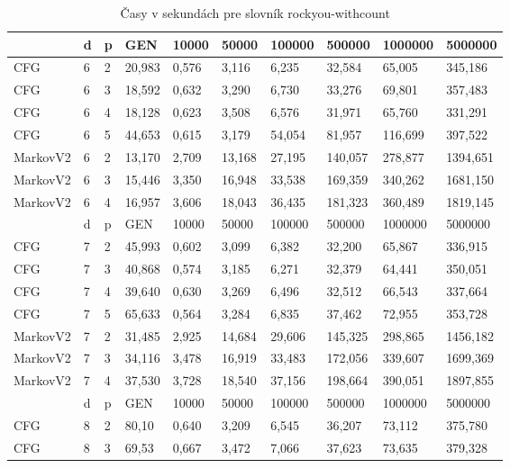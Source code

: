 \begin{table}[]
\centering
\caption{Časy v sekundách pre slovník rockyou-withcount}
\label{tbl:rockyouTime}
\begin{tabular}{lll|lllllll}
       & d & p & GEN     & 10000  & 50000  & 100000 & 500000 & 1000000 & 5000000 \\ \hline
CFG    & 6 & 2 & 20,983   & 0,576  & 3,116  & 6,235  & 32,584 & 65,005  & 345,186 \\
CFG    & 6 & 3 & 18,592    & 0,632  & 3,290  & 6,730  & 33,276 & 69,801  & 357,483 \\
CFG    & 6 & 4 & 18,128   & 0,623  & 3,508   & 6,576   & 31,971 & 65,760  & 331,291 \\
CFG    & 6 & 5 & 44,653 & 0,615 & 3,179 & 54,054 & 81,957 & 116,699 & 397,522 \\
MarkovV2 & 6 & 2 & 13,170     & 2,709  & 13,168  & 27,195  & 140,057 & 278,877  & 1394,651 \\
MarkovV2 & 6 & 3 & 15,446     & 3,350  & 16,948  & 33,538  & 169,359 & 340,262  & 1681,150 \\
MarkovV2 & 6 & 4 & 16,957     & 3,606  & 18,043  & 36,435 & 181,323 & 360,489  & 1819,145 \\ \hline
       & d & p & GEN     & 10000  & 50000  & 100000 & 500000 & 1000000 & 5000000 \\ \hline
CFG    & 7 & 2 & 45,993    & 0,602  & 3,099  & 6,382  & 32,200  & 65,867  & 336,915 \\
CFG    & 7 & 3 & 40,868   & 0,574   & 3,185  & 6,271  & 32,379 & 64,441  & 350,051 \\
CFG    & 7 & 4 & 39,640   & 0,630  & 3,269  & 6,496  & 32,512 & 66,543  & 337,664 \\
CFG    & 7 & 5 & 65,633 & 0,564 & 3,284 & 6,835 & 37,462  & 72,955 & 353,728 \\
MarkovV2 & 7 & 2 & 31,485  & 2,925  & 14,684  & 29,606  & 145,325  & 298,865  & 1456,182 \\
MarkovV2 & 7 & 3 & 34,116     & 3,478  & 16,919  & 33,483  & 172,056 & 339,607  & 1699,369  \\
MarkovV2 & 7 & 4 & 37,530     & 3,728   & 18,540 & 37,156 & 198,664 & 390,051 & 1897,855 \\ \hline
       & d & p & GEN     & 10000  & 50000  & 100000 & 500000 & 1000000 & 5000000 \\ \hline
CFG    & 8 & 2 & 80,10   & 0,640  & 3,209  & 6,545  & 36,207 & 73,112  & 375,780 \\
CFG    & 8 & 3 & 69,53   & 0,667  & 3,472   & 7,066  & 37,623 & 73,635  & 379,328 \\

\end{tabular}
\end{table}
